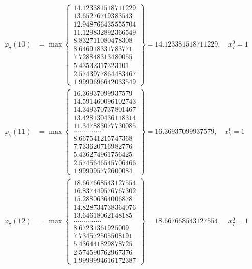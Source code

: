 \documentclass{article}
\begin{document}
\begin{align*}
  
  
  
\varphi_{7}(10) &= \max \left\{ \begin{array}{c}
14.123381518711229 \\
 13.65276719383543 \\
 12.948766435555704 \\
 11.129832892366549 \\
 8.832711080478308 \\
 8.646918331783771 \\
 7.728848313480055 \\
 5.43532317323101 \\
 2.5743977864483467 \\
 1.9999696642033549
\end{array} \right\} = 14.123381518711229, \quad x_{7}^0 = 1\\
  
  
  
  
\varphi_{7}(11) &= \max \left\{ \begin{array}{c}
16.36937099937579 \\
 14.591460096102743 \\
 14.349370737801467 \\
 13.428130436118314 \\
 11.347883077730085 \\
 .............. \\
 8.667541215747368 \\
 7.733620716982776 \\
 5.436274961756425 \\
 2.5745646545706466 \\
 1.999995772600084
\end{array} \right\} = 16.36937099937579, \quad x_{7}^0 = 1\\
  
  
  
  
\varphi_{7}(12) &= \max \left\{ \begin{array}{c}
18.667668543127554 \\
 16.837449576767302 \\
 15.28806364006878 \\
 14.828734738364076 \\
 13.64618062148185 \\
 .............. \\
 8.67231361925009 \\
 7.734572505508191 \\
 5.436441829878725 \\
 2.574590762967376 \\
 1.9999994616172387
\end{array} \right\} = 18.667668543127554, \quad x_{7}^0 = 1\\
  

\end{align*}
\end{document}
